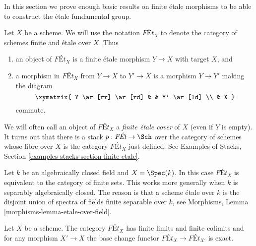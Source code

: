 \noindent
In this section we prove enough basic results on finite \'etale
morphisms to be able to construct the \'etale fundamental group.

\medskip\noindent
Let $X$ be a scheme. We will use the notation $\textit{F\'Et}_X$
to denote the category of schemes finite and \'etale over $X$.
Thus
\begin{enumerate}
\item an object of $\textit{F\'Et}_X$ is a finite \'etale morphism
$Y \to X$ with target $X$, and
\item a morphism in $\textit{F\'Et}_X$
from $Y \to X$ to $Y' \to X$ is a morphism $Y \to Y'$ making
the diagram
$$
\xymatrix{
Y \ar[rr] \ar[rd] & &  Y' \ar[ld] \\
& X
}
$$
commute.
\end{enumerate}
We will often call an object of $\textit{F\'Et}_X$ a
{\it finite \'etale cover} of $X$ (even if $Y$ is empty).
It turns out that there is a stack $p : \textit{F\'Et} \to \Sch$
over the category of schemes whose fibre over $X$ is the category
$\textit{F\'Et}_X$ just defined. See Examples of Stacks, Section
\ref{examples-stacks-section-finite-etale}.

\begin{example}
\label{example-finite-etale-geometric-point}
Let $k$ be an algebraically closed field and $X = \Spec(k)$. In this case
$\textit{F\'Et}_X$ is equivalent to the category of finite sets. This works
more generally when $k$ is separably algebraically closed. The reason is
that a scheme \'etale over $k$ is the disjoint union of spectra of
fields finite separable over $k$, see
Morphisms, Lemma \ref{morphisms-lemma-etale-over-field}.
\end{example}

\begin{lemma}
\label{lemma-finite-etale-covers-limits-colimits}
Let $X$ be a scheme. The category $\textit{F\'Et}_X$ has finite limits and
finite colimits and for any morphism $X' \to X$ the base change functor
$\textit{F\'Et}_X \to \textit{F\'Et}_{X'}$ is exact.
\end{lemma}

